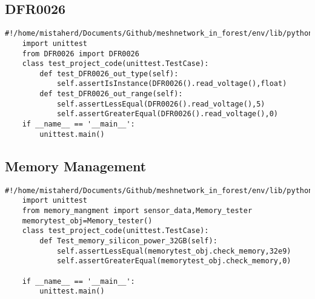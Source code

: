 \subsection{DFR0026}
\begin{lstlisting}[style=mystyle,caption={Code for unit test of DFR0026}]
    #!/home/mistaherd/Documents/Github/meshnetwork_in_forest/env/lib/python3.11
    import unittest
    from DFR0026 import DFR0026
    class test_project_code(unittest.TestCase):
        def test_DFR0026_out_type(self):
            self.assertIsInstance(DFR0026().read_voltage(),float)
        def test_DFR0026_out_range(self):
            self.assertLessEqual(DFR0026().read_voltage(),5)
            self.assertGreaterEqual(DFR0026().read_voltage(),0)
    if __name__ == '__main__':
        unittest.main()    
\end{lstlisting}
\newpage
\subsection{Memory Management}
\begin{lstlisting}[style=mystyle,caption={Code for unit test of memory module}]
    #!/home/mistaherd/Documents/Github/meshnetwork_in_forest/env/lib/python3.11
    import unittest
    from memory_mangment import sensor_data,Memory_tester
    memorytest_obj=Memory_tester()
    class test_project_code(unittest.TestCase):
        def Test_memory_silicon_power_32GB(self):
            self.assertLessEqual(memorytest_obj.check_memory,32e9)
            self.assertGreaterEqual(memorytest_obj.check_memory,0)
    
    if __name__ == '__main__':
        unittest.main()
\end{lstlisting}
\newpage
